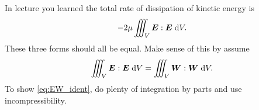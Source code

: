 \documentclass[11pt,letterpaper]{article}
\begin{document}
\subsection{}
In lecture you learned the total rate of dissipation of kinetic energy is
\begin{align}
    -2\mu \iiint_V \boldsymbol{E}:\boldsymbol{E} \;\mathrm{d} V.
\end{align}
These three forms should all be equal. Make sense of this by assume 
\begin{align}
    \iiint_V \boldsymbol{E}:\boldsymbol{E} \;\mathrm{d} V = \iiint_V \boldsymbol{W}:\boldsymbol{W} \;\mathrm{d} V.\label{eq:EW_ident}
\end{align}
To show \eqref{eq:EW_ident}, do plenty of integration by parts and use incompressibility.








    
\vfill
\printbibliography
\end{document}
